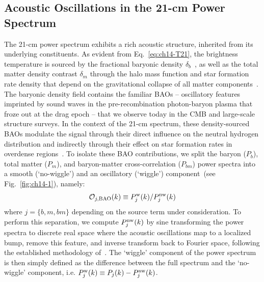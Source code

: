 \subsection{Acoustic Oscillations in the 21-cm Power Spectrum}

\noindent The 21-cm power spectrum exhibits a rich acoustic structure, inherited from its underlying constituents. As evident from Eq.~\eqref{eq:ch14-T21}, the brightness temperature is sourced by the fractional baryonic density $\delta_b$~\citep{Furlanetto:2006jb, Pritchard:2008da, Pritchard:2010pa, pritchard12}, as well as the total matter density contrast $\delta_m$ through the halo mass function and star formation rate density that depend on the gravitational collapse of all matter components~\citep{Cruz:2024fsv}. The baryonic density field contains the familiar BAOs -- oscillatory features imprinted by sound waves in the pre-recombination photon-baryon plasma that froze out at the drag epoch -- that we observe today in the CMB and large-scale structure surveys. In the context of the 21-cm spectrum, these density-sourced BAOs modulate the signal through their direct influence on the neutral hydrogen distribution and indirectly through their effect on star formation rates in overdense regions~\citep{tseliakhovich10, dalal10}.  To isolate these BAO contributions, we split the baryon ($P_b$), total matter ($P_m$), and baryon-matter cross-correlation ($P_{bm}$) power spectra into a smooth (`no-wiggle') and an oscillatory (`wiggle') component~(see Fig.~\ref{fig:ch14-1}), namely:
\begin{equation}
    \mathcal{O}_{j,\rm BAO}(k)\equiv P_{j}^{\rm w}(k)/P_{j}^{\rm nw}(k)
\end{equation}
where $j=\{b,m,bm\}$ depending on the source term under consideration. To perform this separation, we compute $P_j^{\rm nw}(k)$ by sine transforming the power spectra to discrete real space where the acoustic oscillations map to a localized bump, remove this feature, and inverse transform back to Fourier space, following the established methodology of~\cite{Hamann:2010pw,Baumann:2017gkg}. The `wiggle' component of the power spectrum is then simply defined as the difference between the full spectrum and the `no-wiggle' component, i.e. $P_j^{\rm w}(k)\equiv P_j(k)-P^{\rm nw}_j(k)$.


